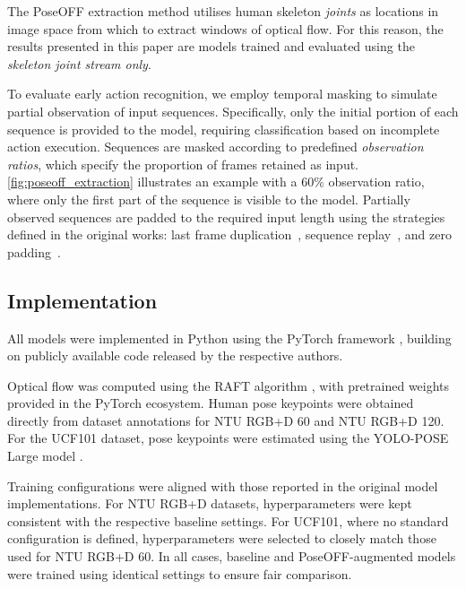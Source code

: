 \documentclass[letterpaper, 10 pt, conference]{ieeeconf}
\begin{document}
The PoseOFF extraction method utilises human skeleton \textit{joints} as locations in image space from which to extract windows of optical flow.
For this reason, the results presented in this paper are models trained and evaluated using the \textit{skeleton joint stream only}.

\label{subsubsec:obs_ratio}
To evaluate early action recognition, we employ temporal masking to simulate partial observation of input sequences. Specifically, only the initial portion of each sequence is provided to the model, requiring classification based on incomplete action execution. Sequences are masked according to predefined \textit{observation ratios}, which specify the proportion of frames retained as input. \autoref{fig:poseoff_extraction} illustrates an example with a 60\% observation ratio, where only the first part of the sequence is visible to the model. Partially observed sequences are padded to the required input length using the strategies defined in the original works: last frame duplication~\cite{chi2025InfoGCNLearningRepresentationPredictingFutureOnlineSkeletonBasedActionRecognition}, sequence replay~\cite{liu2020DisentanglingUnifyingGraphConvolutionsSkeletonBasedActionRecognition}, and zero padding~\cite{duan2022PYSKLGoodPracticesSkeletonActionRecognition}.

\subsection{Implementation}
\label{subsec:implementation}

All models were implemented in Python using the PyTorch framework \cite{paszkePyTorchImperativeStyleHighPerformanceDeepLearningLibrary}, building on publicly available code released by the respective authors.

Optical flow was computed using the RAFT algorithm \cite{teed2020RAFTRecurrentAllPairsFieldTransformsOpticalFlow}, with pretrained weights provided in the PyTorch ecosystem. Human pose keypoints were obtained directly from dataset annotations for NTU RGB+D 60 and NTU RGB+D 120. For the UCF101 dataset, pose keypoints were estimated using the YOLO-POSE Large model \cite{maji2022YOLOPoseEnhancingYOLOMultiPersonPoseEstimationUsingObjectKeypointSimilarityLoss}.

Training configurations were aligned with those reported in the original model implementations. For NTU RGB+D datasets, hyperparameters were kept consistent with the respective baseline settings. For UCF101, where no standard configuration is defined, hyperparameters were selected to closely match those used for NTU RGB+D 60. In all cases, baseline and PoseOFF-augmented models were trained using identical settings to ensure fair comparison.
\end{document}
